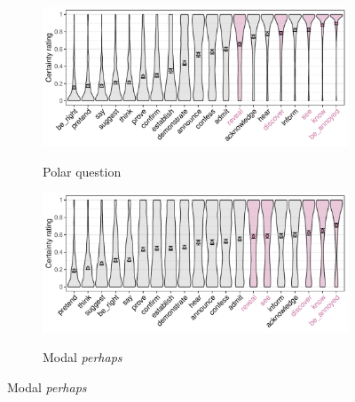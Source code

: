 \documentclass[a4paper,12pt,twoside]{article}
\begin{document}
        \begin{figure}[h!]
            \centering
            \begin{subfigure}[t]{0.49\textwidth}
            \caption{Polar question}
            \includegraphics[width = 1\linewidth]{question-predicate-graph.pdf}
            \label{fig:op-pred-ratings-q}
            \end{subfigure}
            \begin{subfigure}[t]{0.49\textwidth}
            \caption{Modal \emph{perhaps}}
            \includegraphics[width = 1\linewidth]{modal-predicate-graph.pdf}
            \label{fig:op-pred-ratings-m}
            \end{subfigure}


\end{figure}
\end{document}
